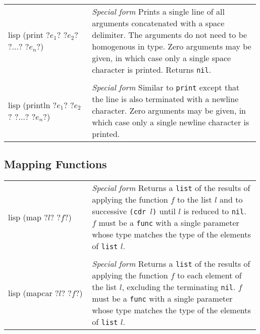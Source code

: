 \documentclass[a4paper, 12pt]{article}
\makeatletter
\newenvironment{funcdefs}
    {\begin{longtable}{@{} x{0.33\linewidth} @{} >{\raggedright\arraybackslash}p{0.66\linewidth} @{}}}
    {\end{longtable}}
\def\specialf/{\textit{Special form}\hspace{0.5em}}
\makeatother
\begin{document}
\begin{funcdefs}
    \begin{minipage}[t]{\linewidth}
        \centering
        \begin{cminted}[autogobble=true, escapeinside=??]{lisp}
            (print ?$e_1$? ?$e_2$? ?$\ldots$? ?$e_n$?)
        \end{cminted}
    \end{minipage}
    & \specialf/ Prints a single line of all arguments concatenated with a space delimiter. The arguments do not need to be homogenous in type. Zero arguments may be given, in which case only a single space character is printed. Returns \texttt{nil}.
    \\ \\
    \begin{minipage}[t]{\linewidth}
        \centering
        \begin{cminted}[autogobble=true, escapeinside=??]{lisp}
            (println ?$e_1$? ?$e_2$? ?$\ldots$? ?$e_n$?)
        \end{cminted}
    \end{minipage}
    & \specialf/ Similar to \texttt{print} except that the line is also terminated with a newline character. Zero arguments may be given, in which case only a single newline character is printed.
\end{funcdefs}

\subsection{Mapping Functions}
\begin{funcdefs}
    \begin{minipage}[t]{\linewidth}
        \centering
        \begin{cminted}[autogobble=true, escapeinside=??]{lisp}
            (map ?$l$? ?$f$?)
        \end{cminted}
    \end{minipage}
    & \specialf/ Returns a \texttt{list} of the results of applying the function $f$ to the list $l$ and to successive \texttt{(cdr $l$)} until $l$ is reduced to \texttt{nil}. $f$ must be a \texttt{func} with a single parameter whose type matches the type of the elements of \texttt{list} $l$.
    \\ \\
    \begin{minipage}[t]{\linewidth}
        \centering
        \begin{cminted}[autogobble=true, escapeinside=??]{lisp}
            (mapcar ?$l$? ?$f$?)
        \end{cminted}
    \end{minipage}
    & \specialf/ Returns a \texttt{list} of the results of applying the function $f$ to each element of the list $l$, excluding the terminating \texttt{nil}. $f$ must be a \texttt{func} with a single parameter whose type matches the type of the elements of \texttt{list} $l$.
\end{funcdefs}
\end{document}
